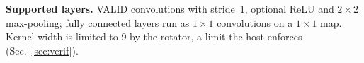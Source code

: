 \textbf{Supported layers.} VALID convolutions with stride~1, optional ReLU
and $2{\times}2$ max-pooling; fully connected layers run as $1{\times}1$
convolutions on a $1{\times}1$ map. Kernel width is limited to 9 by the
rotator, a limit the host enforces (Sec.~\ref{sec:verif}).
